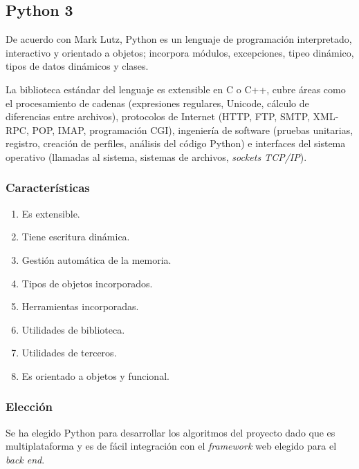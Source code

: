 \subsection{Python 3 }
De acuerdo con Mark Lutz\cite{lutz_learning_2013}, Python es un lenguaje de programación interpretado, interactivo y orientado a objetos; incorpora módulos, excepciones, tipeo dinámico, tipos de datos dinámicos y clases.


La biblioteca estándar del lenguaje es extensible en C o C++, cubre áreas como el procesamiento de cadenas (expresiones regulares, Unicode, cálculo de diferencias entre archivos), protocolos de Internet (HTTP, FTP, SMTP, XML-RPC, POP, IMAP, programación CGI), ingeniería de software (pruebas unitarias, registro, creación de perfiles, análisis del código Python) e interfaces del sistema operativo (llamadas al sistema, sistemas de archivos, \textit{sockets TCP/IP}).

\subsubsection*{Características}
\begin{enumerate}
    \item Es extensible.
    \item Tiene escritura dinámica.
    \item Gestión automática de la memoria.
    \item Tipos de objetos incorporados.
    \item Herramientas incorporadas.
    \item Utilidades de biblioteca.
    \item Utilidades de terceros.
    \item Es orientado a objetos y funcional.
\end{enumerate}


\subsubsection*{Elección}\label{ref:python}
Se ha elegido Python para desarrollar los algoritmos del proyecto dado que es multiplataforma y es de fácil integración con el \textit{framework} web elegido para el \textit{back end}.